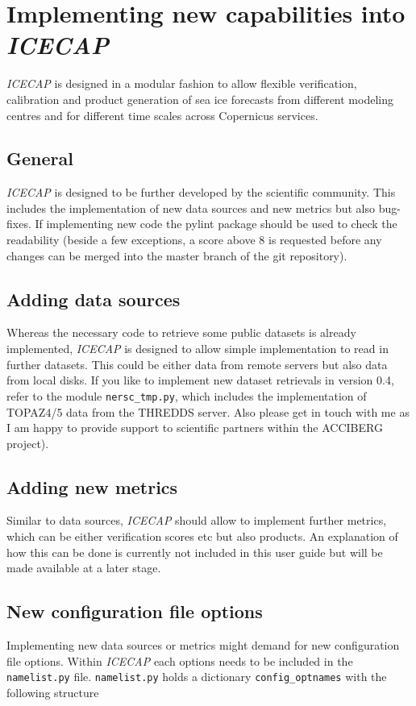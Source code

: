 \documentclass[DIV=10, parskip=full]{scrreprt}
\newcommand{\ice}{\textit{ICECAP}\xspace}
\newcommand{\version}{0.4\xspace}
\newcommand{\notimplement}[1]{#1}
\begin{document}
\section{Implementing new capabilities into  \ice}\label{chap:develop}
\ice is designed in a modular fashion to allow flexible verification, calibration and product generation of sea ice forecasts from different modeling centres and for different time scales across Copernicus services. 

\subsection{General}
\ice is designed to be further developed by the scientific community. This includes the implementation of new data sources and new metrics but also bug-fixes. If implementing new code the pylint package should be used to check the readability (beside a few exceptions, a score above 8 is requested before any changes can be merged into the master branch of the git repository).

\subsection{Adding data sources}
Whereas the necessary code to retrieve some public datasets is already implemented, \ice is designed to allow simple implementation to read in further datasets. This could be either data from remote servers but also data from local disks. \notimplement{If you like to implement new dataset retrievals in version \version, refer to the module \texttt{nersc\_tmp.py}, which includes the implementation of TOPAZ4/5 data from the THREDDS server. Also please get in touch with me as I am happy to provide support to scientific partners within the ACCIBERG project).}

\subsection{Adding new metrics}
Similar to data sources, \ice should allow to implement further metrics, which can be either verification scores etc but also products. An explanation of how this can be done is currently \notimplement{not included in this user guide but will be made available at a later stage}. \\

\subsection{New configuration file options}
Implementing new data sources or metrics might demand for new configuration file options. Within \ice each options needs to be included in the \texttt{namelist.py} file.   \texttt{namelist.py} holds a dictionary \texttt{config\_optnames} with the following structure\\
\end{document}
